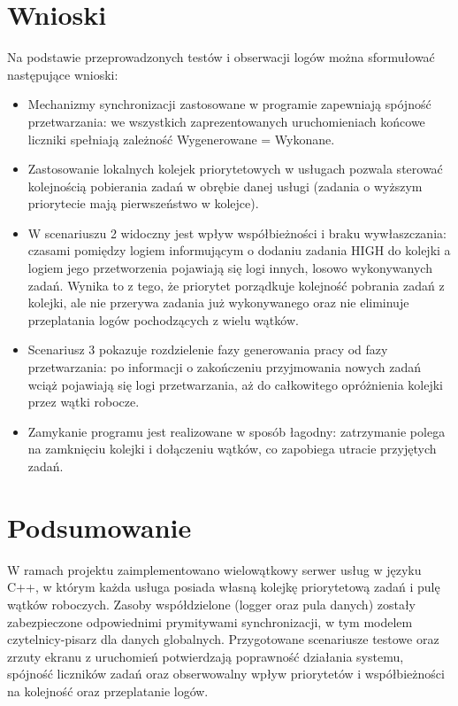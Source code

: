 \documentclass[a4paper,12pt]{article}
\begin{document}
    \section{Wnioski}
        \vspace{0.5em}
        Na podstawie przeprowadzonych testów i obserwacji logów można sformułować następujące wnioski:
        \begin{itemize}
            \item Mechanizmy synchronizacji zastosowane w programie zapewniają spójność przetwarzania: we wszystkich zaprezentowanych uruchomieniach końcowe liczniki spełniają zależność Wygenerowane = Wykonane.
            \item Zastosowanie lokalnych kolejek priorytetowych w usługach pozwala sterować kolejnością pobierania zadań w obrębie danej usługi (zadania o wyższym priorytecie mają pierwszeństwo w kolejce).
            \item W scenariuszu 2 widoczny jest wpływ współbieżności i braku wywłaszczania: czasami pomiędzy logiem informującym o dodaniu zadania HIGH do kolejki a logiem jego przetworzenia pojawiają się logi innych, losowo wykonywanych zadań. Wynika to z tego, że priorytet porządkuje kolejność pobrania zadań z kolejki, ale nie przerywa zadania już wykonywanego oraz nie eliminuje przeplatania logów pochodzących z wielu wątków.
            \item Scenariusz 3 pokazuje rozdzielenie fazy generowania pracy od fazy przetwarzania: po informacji o zakończeniu przyjmowania nowych zadań wciąż pojawiają się logi przetwarzania, aż do całkowitego opróżnienia kolejki przez wątki robocze.
            \item Zamykanie programu jest realizowane w sposób łagodny: zatrzymanie polega na zamknięciu kolejki i dołączeniu wątków, co zapobiega utracie przyjętych zadań.
        \end{itemize}
    \newpage
    \vspace*{1em}
    \section{Podsumowanie}
        \vspace{0.5em}
        W ramach projektu zaimplementowano wielowątkowy serwer usług w języku C++, w którym każda usługa posiada własną kolejkę priorytetową zadań i pulę wątków roboczych. Zasoby współdzielone (logger oraz pula danych) zostały zabezpieczone odpowiednimi prymitywami synchronizacji, w tym modelem czytelnicy-pisarz dla danych globalnych. Przygotowane scenariusze testowe oraz zrzuty ekranu z uruchomień potwierdzają poprawność działania systemu, spójność liczników zadań oraz obserwowalny wpływ priorytetów i współbieżności na kolejność oraz przeplatanie logów.
        \vspace{1em}
\end{document}
